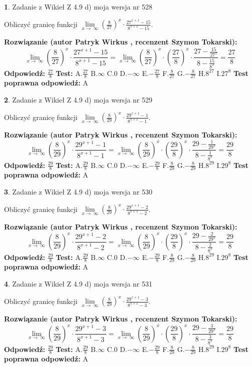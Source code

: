 \documentclass[12pt, a4paper]{article}
\theoremstyle{definition} %
\newtheorem{zad}{}
\newcommand{\zadStart}[1]{\begin{zad}#1\newline}
\newcommand{\zadStop}{\end{zad}}
\newcommand{\rozwStart}[2]{\noindent \textbf{Rozwiązanie (autor #1 , recenzent #2): }\newline}
\newcommand{\rozwStop}{\newline}
\newcommand{\odpStart}{\noindent \textbf{Odpowiedź:}\newline}
\newcommand{\odpStop}{\newline}
\newcommand{\testStart}{\noindent \textbf{Test:}\newline}
\newcommand{\testStop}{\newline}
\newcommand{\kluczStart}{\noindent \textbf{Test poprawna odpowiedź:}\newline}
\newcommand{\kluczStop}{\newline}
\begin{document}
\zadStart{Zadanie z Wikieł Z 4.9 d) moja wersja nr 528}


Obliczyć granicę funkcji  $\lim\limits_{x\to\ \infty}(\frac{8}{27})^{x}\cdot\frac{27^{x+1}-15}{8^{x+1}-15}$.
\zadStop
\rozwStart{Patryk Wirkus}{Szymon Tokarski}
$$\lim\limits_{x\to\ \infty}(\frac{8}{27})^{x}\cdot\frac{27^{x+1}-15}{8^{x+1}-15}=\lim\limits_{x\to\ \infty}(\frac{8}{27})^{x}\cdot(\frac{27}{8})^{x} \cdot \frac{27-\frac{15}{27^{x}}}{8-\frac{15}{8^{x}}} = \frac{27}{8}$$
\rozwStop
\odpStart
$\frac{27}{8}$
\odpStop
\testStart
A.$\frac{27}{8}$ B.$\infty$ C.$0$ D.$-\infty$ E.$-\frac{27}{8}$
F.$\frac{8}{27}$ G.$-\frac{8}{27}$
H.$8^{27}$
I.$27^{8}$
\testStop
\kluczStart
A
\kluczStop



\zadStart{Zadanie z Wikieł Z 4.9 d) moja wersja nr 529}


Obliczyć granicę funkcji  $\lim\limits_{x\to\ \infty}(\frac{8}{29})^{x}\cdot\frac{29^{x+1}-1}{8^{x+1}-1}$.
\zadStop
\rozwStart{Patryk Wirkus}{Szymon Tokarski}
$$\lim\limits_{x\to\ \infty}(\frac{8}{29})^{x}\cdot\frac{29^{x+1}-1}{8^{x+1}-1}=\lim\limits_{x\to\ \infty}(\frac{8}{29})^{x}\cdot(\frac{29}{8})^{x} \cdot \frac{29-\frac{1}{29^{x}}}{8-\frac{1}{8^{x}}} = \frac{29}{8}$$
\rozwStop
\odpStart
$\frac{29}{8}$
\odpStop
\testStart
A.$\frac{29}{8}$ B.$\infty$ C.$0$ D.$-\infty$ E.$-\frac{29}{8}$
F.$\frac{8}{29}$ G.$-\frac{8}{29}$
H.$8^{29}$
I.$29^{8}$
\testStop
\kluczStart
A
\kluczStop



\zadStart{Zadanie z Wikieł Z 4.9 d) moja wersja nr 530}


Obliczyć granicę funkcji  $\lim\limits_{x\to\ \infty}(\frac{8}{29})^{x}\cdot\frac{29^{x+1}-2}{8^{x+1}-2}$.
\zadStop
\rozwStart{Patryk Wirkus}{Szymon Tokarski}
$$\lim\limits_{x\to\ \infty}(\frac{8}{29})^{x}\cdot\frac{29^{x+1}-2}{8^{x+1}-2}=\lim\limits_{x\to\ \infty}(\frac{8}{29})^{x}\cdot(\frac{29}{8})^{x} \cdot \frac{29-\frac{2}{29^{x}}}{8-\frac{2}{8^{x}}} = \frac{29}{8}$$
\rozwStop
\odpStart
$\frac{29}{8}$
\odpStop
\testStart
A.$\frac{29}{8}$ B.$\infty$ C.$0$ D.$-\infty$ E.$-\frac{29}{8}$
F.$\frac{8}{29}$ G.$-\frac{8}{29}$
H.$8^{29}$
I.$29^{8}$
\testStop
\kluczStart
A
\kluczStop



\zadStart{Zadanie z Wikieł Z 4.9 d) moja wersja nr 531}


Obliczyć granicę funkcji  $\lim\limits_{x\to\ \infty}(\frac{8}{29})^{x}\cdot\frac{29^{x+1}-3}{8^{x+1}-3}$.
\zadStop
\rozwStart{Patryk Wirkus}{Szymon Tokarski}
$$\lim\limits_{x\to\ \infty}(\frac{8}{29})^{x}\cdot\frac{29^{x+1}-3}{8^{x+1}-3}=\lim\limits_{x\to\ \infty}(\frac{8}{29})^{x}\cdot(\frac{29}{8})^{x} \cdot \frac{29-\frac{3}{29^{x}}}{8-\frac{3}{8^{x}}} = \frac{29}{8}$$
\rozwStop
\odpStart
$\frac{29}{8}$
\odpStop
\testStart
A.$\frac{29}{8}$ B.$\infty$ C.$0$ D.$-\infty$ E.$-\frac{29}{8}$
F.$\frac{8}{29}$ G.$-\frac{8}{29}$
H.$8^{29}$
I.$29^{8}$
\testStop
\kluczStart
A
\kluczStop
\end{document}
